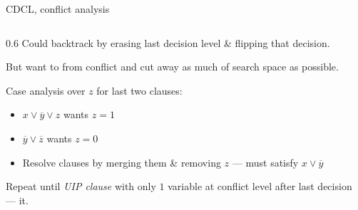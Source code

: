 \documentclass{cons-beamer}
\begin{document}
\begin{frame}{CDCL, conflict analysis}
\begin{columns}
		\begin{column}{0.6\textwidth}
			\small 
			Could backtrack by erasing last decision level \& flipping that decision.
			\medskip
			\pause
			
			But want to  from conflict and cut away as much of search space as possible.
			\medskip
			\pause

			Case analysis over $z$ for last two clauses:
			\begin{itemize}
				\item 
				{$x \lor \overline{y} \lor z$} wants $z=1$
				\item 
				{$\overline{y} \lor \overline{z}$} wants $z=0$
				\item 
				{Resolve} clauses by merging them \& removing $z$ ---
				must satisfy
				{$x \lor \overline{y}$}
			\end{itemize}
			\medskip
			\pause
	
			Repeat until \textit{UIP clause} with only $1$ variable	at conflict level after last decision ---  it.
		\end{column}
	\end{columns}
\end{frame}
\end{document}
